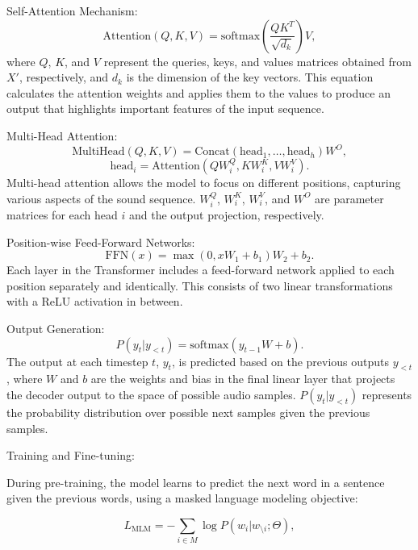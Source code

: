 \documentclass[11pt,a4paper,oneside]{report}
\begin{document}
Self-Attention Mechanism:
\begin{equation}
\text{Attention}(Q, K, V) = \text{softmax}\left(\frac{QK^T}{\sqrt{d_k}}\right)V,
\end{equation}
where $Q$, $K$, and $V$ represent the queries, keys, and values matrices obtained from $X'$, respectively, and $d_k$ is the dimension of the key vectors. This equation calculates the attention weights and applies them to the values to produce an output that highlights important features of the input sequence.

Multi-Head Attention:
\begin{equation}
\text{MultiHead}(Q, K, V) = \text{Concat}(\text{head}_1, \ldots, \text{head}_h)W^O,
\end{equation}
\begin{equation}
\text{head}_i = \text{Attention}(QW^Q_i, KW^K_i, VW^V_i).
\end{equation}
Multi-head attention allows the model to focus on different positions, capturing various aspects of the sound sequence. $W^Q_i$, $W^K_i$, $W^V_i$, and $W^O$ are parameter matrices for each head $i$ and the output projection, respectively.

Position-wise Feed-Forward Networks:
\begin{equation}
\text{FFN}(x) = \max(0, xW_1 + b_1)W_2 + b_2.
\end{equation}
Each layer in the Transformer includes a feed-forward network applied to each position separately and identically. This consists of two linear transformations with a ReLU activation in between.

Output Generation:
\begin{equation}
P(y_t | y_{<t}) = \text{softmax}(y_{t-1}W + b).
\end{equation}
The output at each timestep $t$, $y_t$, is predicted based on the previous outputs $y_{<t}$, where $W$ and $b$ are the weights and bias in the final linear layer that projects the decoder output to the space of possible audio samples. $P(y_t | y_{<t})$ represents the probability distribution over possible next samples given the previous samples.

Training and Fine-tuning:

During pre-training, the model learns to predict the next word in a sentence given the previous words, using a masked language modeling objective:

\begin{equation}
L_{\text{MLM}} = -\sum_{i \in M} \log P(w_i | w_{\setminus i}; \Theta),
\end{equation}
\end{document}

